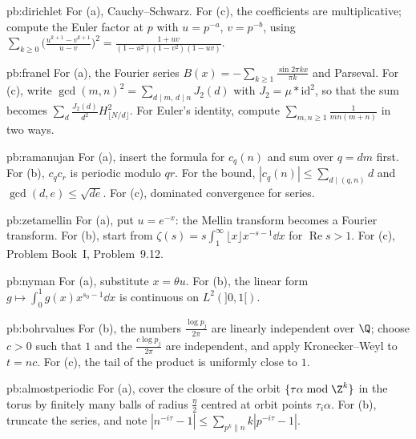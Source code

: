 \begin{hint}{pb:dirichlet}
For (a), Cauchy--Schwarz. For (c), the coefficients are multiplicative; compute the Euler factor at $p$ with $u=p^{-a}$, $v=p^{-b}$, using
$\sum_{k\ge0}\bigl(\frac{u^{k+1}-v^{k+1}}{u-v}\bigr)^2=\frac{1+uv}{(1-u^2)(1-v^2)(1-uv)}$.
\end{hint}

\begin{hint}{pb:franel}
For (a), the Fourier series $B(x)=-\sum_{k\ge1}\frac{\sin2\pi kx}{\pi k}$ and Parseval. For (c), write $\gcd(m,n)^2=\sum_{d\mid m,\,d\mid n}J_2(d)$ with $J_2=\mu*\mathrm{id}^2$, so that
the sum becomes $\sum_d\frac{J_2(d)}{d^2}H_{\lfloor N/d\rfloor}^2$. For Euler's identity, compute $\sum_{m,n\ge1}\frac1{mn(m+n)}$ in two ways.
\end{hint}

\begin{hint}{pb:ramanujan}
For (a), insert the formula for $c_q(n)$ and sum over $q=dm$ first. For (b), $c_qc_r$ is periodic modulo $qr$. For the bound, $|c_q(n)|\le\sum_{d\mid(q,n)}d$ and
$\gcd(d,e)\le\sqrt{de}$. For (c), dominated convergence for series.
\end{hint}

\begin{hint}{pb:zetamellin}
For (a), put $u=e^{-x}$: the Mellin transform becomes a Fourier transform. For (b), start from $\zeta(s)=s\int_1^\infty\lfloor x\rfloor x^{-s-1}\dd x$ for $\operatorname{Re}s>1$. For (c),
Problem Book~I, Problem~9.12.
\end{hint}

\begin{hint}{pb:nyman}
For (a), substitute $x=\theta u$. For (b), the linear form $g\mapsto\int_0^1g(x)x^{s_0-1}\dd x$ is continuous on $L^2(]0,1[)$.
\end{hint}

\begin{hint}{pb:bohrvalues}
For (b), the numbers $\frac{\log p_j}{2\pi}$ are linearly independent over $\Q$; choose $c>0$ such that $1$ and the $\frac{c\log p_j}{2\pi}$ are independent, and apply
Kronecker--Weyl to $t=nc$. For (c), the tail of the product is uniformly close to $1$.
\end{hint}

\begin{hint}{pb:almostperiodic}
For (a), cover the closure of the orbit $\{\tau\alpha\bmod\Z^k\}$ in the torus by finitely many balls of radius $\frac\eta2$ centred at orbit points $\tau_i\alpha$. For (b),
truncate the series, and note $|n^{-i\tau}-1|\le\sum_{p^k\parallel n}k|p^{-i\tau}-1|$.
\end{hint}


